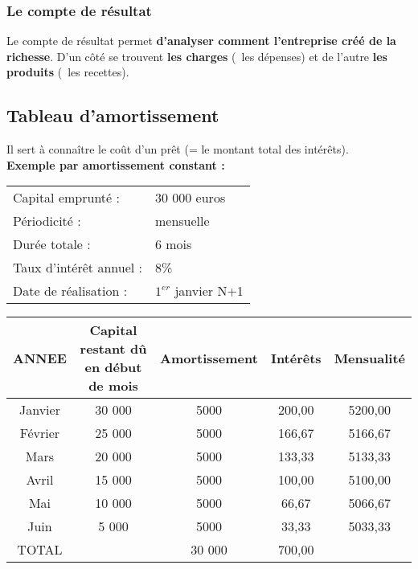 \subsubsection{Le compte de résultat}
Le compte de résultat permet \textbf{d'analyser comment l'entreprise créé de la richesse}. D'un c\^oté se trouvent \textbf{les charges} (~les dépenses) et de l'autre \textbf{les produits} (~les recettes).


\subsection{Tableau d'amortissement}
Il sert à conna\^itre le co\^ut d'un pr\^et (= le montant total des intér\^ets).\\

\textbf{Exemple par amortissement constant :}\\
\begin{tabular}{ll}
	Capital emprunté : & 30 000 euros \\
	Périodicité : & mensuelle \\
	Durée totale : & 6 mois \\
	Taux d'intér\^et annuel : & 8\% \\
	Date de réalisation : & $1^{er}$ janvier N+1
\end{tabular}


\begin{tabular}{|c|c|c|c|c|}

	\hline
	
	ANNEE & Capital restant d\^u en début de mois & Amortissement & Intér\^ets & Mensualité \\
	
	\hline
	
	Janvier & 30 000 & 5000 & 200,00 & 5200,00 \\
		
	\hline
	
	Février & 25 000 & 5000 & 166,67 & 5166,67 \\
		
	\hline
	
	Mars & 20 000 & 5000 & 133,33 & 5133,33 \\
		
	\hline
	
	Avril & 15 000 & 5000 & 100,00 & 5100,00 \\
		
	\hline
	
	Mai & 10 000 & 5000 & 66,67 & 5066,67 \\
		
	\hline

	Juin & 5 000 & 5000 & 33,33 & 5033,33 \\
		
	\hline
	
	TOTAL &	& 30 000 & 700,00 & \\
	
	\hline
	
\end{tabular}


